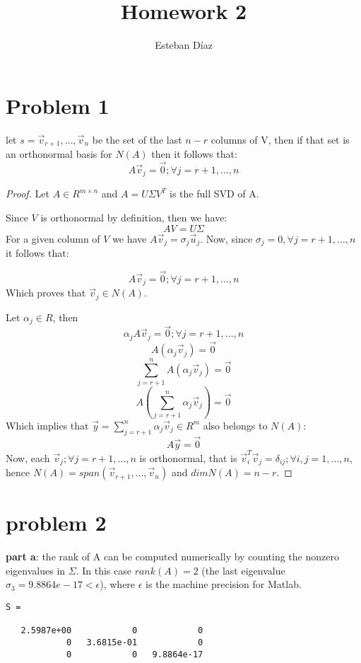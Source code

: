 \documentclass[10pt]{article}
\author{Esteban D\'{i}az}
\title{Homework 2}{}
\begin{document}
\maketitle

\section{Problem 1}
let $s = {\vec{v}_{r+1},\dots,\vec{v}_n}$ be the set of the last $n-r$ 
columns of V, then if that set is an orthonormal basis for $N(A)$ then it
follows that:
\[
  { A}\vec{v}_j = \vec{0}; \forall j=r+1,\dots,n
\]

\begin{proof}
  Let $A \in R^{m \times n}$ and $A= U \Sigma V^T$ is the full SVD of
A.

  Since $V$ is orthonormal by definition, then we have:
    \[
      A V = U \Sigma
    \]
  For a given column of $V$ we have $ A\vec{v}_j = \sigma_j \vec{u}_j$.
  Now, since $\sigma_j =0,\forall j=r+1,\dots,n$ it follows that:

    \[
      A \vec{v}_j = \vec{0}; \forall j=r+1,\dots,n
    \] 
  Which proves that $\vec{v}_j \in N(A)$.

  Let $\alpha_j \in R$, then 
    \[
      \alpha_j  A \vec{v}_j = \vec{0}; \forall j=r+1,\dots,n
    \]
    \[
      A (\alpha_j\vec{v}_j) = \vec{0}
    \]
    \[
      \sum_{j=r+1}^n A (\alpha_j \vec{v}_j) = \vec{0}
    \]
    \[
      A \left(\sum_{j=r+1}^n \alpha_j \vec{v}_j\right) = \vec{0}
    \]
  Which implies that $\vec{y} = \sum_{j=r+1}^n \alpha_j \vec{v}_j \in R^m$
  also belongs to $N(A)$:
    \[
     A \vec{y} = \vec{0}
    \]
  Now, each $\vec{v}_j; \forall j=r+1,\dots,n$ is orthonormal, that
  is $\vec{v}_i^T \vec{v}_j = \delta_{ij}; \forall i,j=1,\dots,n$,
  hence $N(A) = span(\vec{v}_{r+1},\dots,\vec{v}_n)$ and $dim N(A) = n-r$.  

\end{proof}

\section{problem 2}
\textbf{part a}: the rank of A can be computed numerically by 
counting the nonzero eigenvalues in $\Sigma$. In this case 
$rank(A) = 2$ (the last eigenvalue $\sigma_3 = 9.8864e-17 <\epsilon$),
where $\epsilon$ is the machine precision for Matlab\textsuperscript{\textregistered}.
\begin{verbatim}
S =

   2.5987e+00            0            0
            0   3.6815e-01            0
            0            0   9.8864e-17

\end{verbatim}
\end{document}
